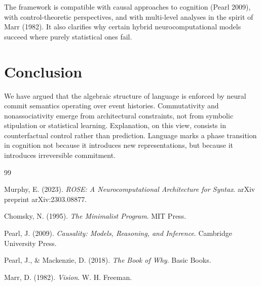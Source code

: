 \documentclass[11pt]{article}
\begin{document}
The framework is compatible with causal approaches to cognition (Pearl 2009), with control-theoretic perspectives, and with multi-level analyses in the spirit of Marr (1982). It also clarifies why certain hybrid neurocomputational models succeed where purely statistical ones fail.

\section{Conclusion}

We have argued that the algebraic structure of language is enforced by neural commit semantics operating over event histories. Commutativity and nonassociativity emerge from architectural constraints, not from symbolic stipulation or statistical learning. Explanation, on this view, consists in counterfactual control rather than prediction. Language marks a phase transition in cognition not because it introduces new representations, but because it introduces irreversible commitment.


\begin{thebibliography}{99}

Murphy, E. (2023).
\newblock \emph{ROSE: A Neurocomputational Architecture for Syntax}.
\newblock arXiv preprint arXiv:2303.08877.

Chomsky, N. (1995).
\newblock \emph{The Minimalist Program}.
\newblock MIT Press.

Pearl, J. (2009).
\newblock \emph{Causality: Models, Reasoning, and Inference}.
\newblock Cambridge University Press.

Pearl, J., \& Mackenzie, D. (2018).
\newblock \emph{The Book of Why}.
\newblock Basic Books.

Marr, D. (1982).
\newblock \emph{Vision}.
\newblock W. H. Freeman.

\end{thebibliography}
\end{document}
